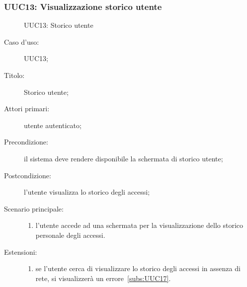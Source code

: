 \documentclass[../../../analisi-dei-requisiti.tex]{subfiles}
\begin{document}
\subsubsection{UUC13: Visualizzazione storico utente}%
\label{subs:UUC13}

\begin{figure}[H]
  \centering
  \caption{UUC13: Storico utente}%
  \label{fig:UUC13}
\end{figure}

\begin{description}
  \item[Caso d'uso:] UUC13;
  \item[Titolo:] Storico utente;
  \item[Attori primari:] utente autenticato;
  \item[Precondizione:] il sistema deve rendere disponibile la schermata di storico utente;
  \item[Postcondizione:] l'utente visualizza lo storico degli accessi;
  \item[Scenario principale:]
        \begin{enumerate}
          \item l'utente accede ad una schermata per la visualizzazione dello storico personale degli accessi.
        \end{enumerate}
  \item[Estensioni:]
        \begin{enumerate}
          \item se l'utente cerca di visualizzare lo storico degli accessi in assenza di rete, si visualizzerà un errore~\ref{subs:UUC17}.
        \end{enumerate}
\end{description}
\end{document}
